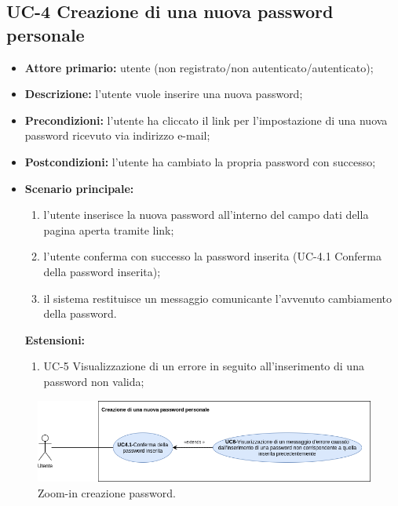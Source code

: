 \subsection{UC-4 Creazione di una nuova password personale}
\begin{itemize}
	\item \textbf{Attore primario:} utente (non registrato/non autenticato/autenticato);

	\item \textbf{Descrizione:} l'utente vuole inserire una nuova password;

	\item \textbf{Precondizioni:} l'utente ha cliccato il link per l'impostazione di una nuova password ricevuto via indirizzo e-mail;

	\item \textbf{Postcondizioni:} l'utente ha cambiato la propria password con successo;

	\item \textbf{Scenario principale:}
	      \begin{enumerate}
		      \item l'utente inserisce la nuova password all'interno del campo dati della pagina aperta tramite link;
		      \item l'utente conferma con successo la password inserita (UC-4.1 Conferma della password inserita);
		      \item il sistema restituisce un messaggio comunicante l'avvenuto cambiamento della password.
	      \end{enumerate}

	      \textbf{Estensioni:}
	      \begin{enumerate}
		      \item UC-5 Visualizzazione di un errore in seguito all'inserimento di una password non valida;
	      \end{enumerate}
\end{itemize}

\begin{figure}[H]
	\centering
	\includegraphics[width=\textwidth]{src/CasiDUso/immagini/SottocasoCreazionePassword.png}
	\caption{Zoom-in creazione password.}
\end{figure}

